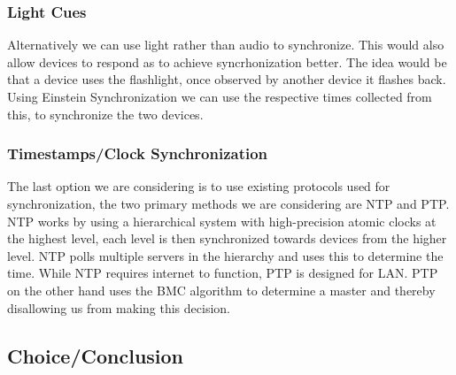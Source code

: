 \subsubsection{Light Cues}
Alternatively we can use light rather than audio to synchronize.
This would also allow devices to respond as to achieve syncrhonization better.
The idea would be that a device uses the flashlight, once observed by another device it flashes back.
Using Einstein Synchronization we can use the respective times collected from this, to synchronize the two devices.
\subsubsection{Timestamps/Clock Synchronization}
The last option we are considering is to use existing protocols used for synchronization, the two primary methods we are considering are \ac{NTP} and \ac{PTP}.
\ac{NTP} works by using a hierarchical system with high-precision atomic clocks at the highest level, each level is then synchronized towards devices from the higher level.
\ac{NTP} polls multiple servers in the hierarchy and uses this to determine the time.
While \ac{NTP} requires internet to function, \ac{PTP} is designed for LAN.
\ac{PTP} on the other hand uses the \ac{BMC} algorithm to determine a master and thereby disallowing us from making this decision.


\subsection{Choice/Conclusion}
